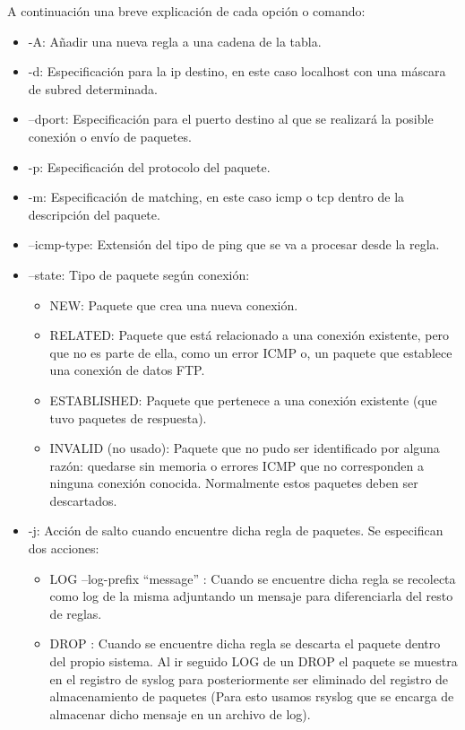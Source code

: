 A continuación una breve explicación de cada opción o comando:
\begin{itemize}
\item -A: Añadir una nueva regla a una cadena de la tabla.
\item -d: Especificación para la ip destino, en este caso localhost con una máscara de subred determinada.
\item --dport: Especificación para el puerto destino al que se realizará la posible conexión o envío de paquetes.
\item -p: Especificación del protocolo del paquete.
\item -m: Especificación de matching, en este caso icmp o tcp dentro de la descripción del paquete.
\item --icmp-type: Extensión del tipo de ping que se va a procesar desde la regla.
\item --state: Tipo de paquete según conexión:
  \begin{itemize}
  \item NEW: Paquete que crea una nueva conexión.
  \item RELATED: Paquete que está relacionado a una conexión existente, pero que no es parte de ella, como un error ICMP o, un paquete que establece una conexión de datos FTP.
  \item ESTABLISHED: Paquete que pertenece a una conexión existente (que tuvo paquetes de respuesta).
  \item INVALID (no usado): Paquete que no pudo ser identificado por alguna razón: quedarse sin memoria o errores ICMP que no corresponden a ninguna conexión conocida. Normalmente estos paquetes deben ser descartados.
  \end{itemize}
\item -j: Acción de salto cuando encuentre dicha regla de paquetes. Se especifican dos acciones:
  \begin{itemize}
  \item LOG --log-prefix ``message'' : Cuando se encuentre dicha regla se recolecta como log de la misma adjuntando un mensaje para diferenciarla del resto de reglas.
  \item DROP : Cuando se encuentre dicha regla se descarta el paquete dentro del propio sistema. Al ir seguido LOG de un DROP el paquete se muestra en el registro de syslog para posteriormente ser eliminado del registro de almacenamiento de paquetes (Para esto usamos rsyslog que se encarga de almacenar dicho mensaje en un archivo de log).
  \end{itemize}
\end{itemize}

